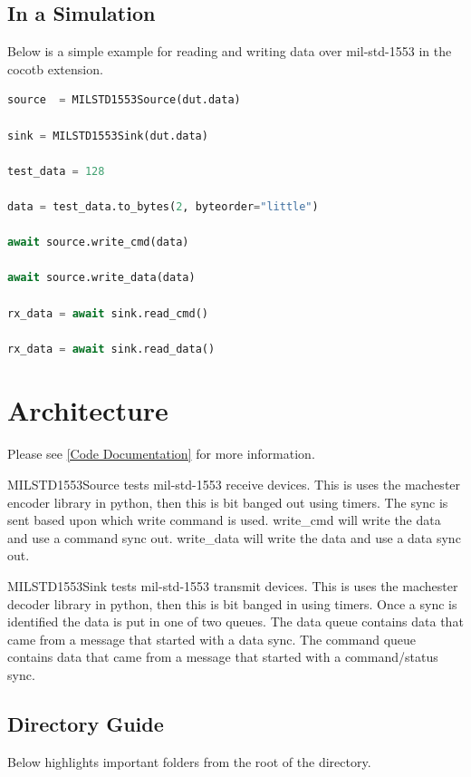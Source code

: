 \subsection{In a Simulation}
\par
Below is a simple example for reading and writing data over mil-std-1553 in the cocotb extension.
\begin{lstlisting}[language=Python]
source  = MILSTD1553Source(dut.data)

sink = MILSTD1553Sink(dut.data)

test_data = 128

data = test_data.to_bytes(2, byteorder="little")

await source.write_cmd(data)

await source.write_data(data)

rx_data = await sink.read_cmd()

rx_data = await sink.read_data()
\end{lstlisting}

\section{Architecture}

Please see \ref{Code Documentation} for more information.

\par
MILSTD1553Source tests mil-std-1553 receive devices. This is uses the machester encoder library in python, then this is bit banged out using timers.
The sync is sent based upon which write command is used. write\_cmd will write the data and use a command sync out. write\_data will write the data and
use a data sync out.
\par
MILSTD1553Sink tests mil-std-1553 transmit devices. This is uses the machester decoder library in python, then this is bit banged in using timers. Once a
sync is identified the data is put in one of two queues. The data queue contains data that came from a message that started with a data sync. The command
queue contains data that came from a message that started with a command/status sync.

\subsection{Directory Guide}

\par
Below highlights important folders from the root of the directory.

